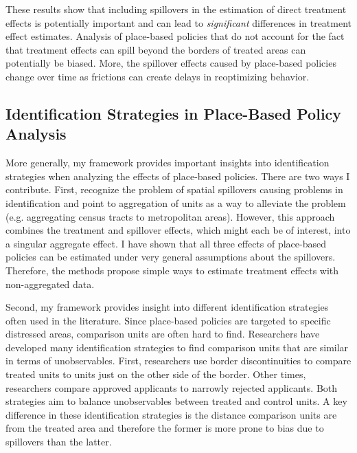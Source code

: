\documentclass[11pt]{article}
\begin{document}
These results show that including spillovers in the estimation of direct treatment effects is potentially important and can lead to \emph{significant} differences in treatment effect estimates. Analysis of place-based policies that do not account for the fact that treatment effects can spill beyond the borders of treated areas can potentially be biased. More, the spillover effects caused by place-based policies change over time as frictions can create delays in reoptimizing behavior. 

\subsection{Identification Strategies in Place-Based Policy Analysis}

More generally, my framework provides important insights into identification strategies when analyzing the effects of place-based policies. There are two ways I contribute. First, \citet{Baum-Snow_Ferreira_2015} recognize the problem of spatial spillovers causing problems in identification and point to aggregation of units as a way to alleviate the problem (e.g. aggregating census tracts to metropolitan areas). However, this approach combines the treatment and spillover effects, which might each be of interest, into a singular aggregate effect. I have shown that all three effects of place-based policies can be estimated under very general assumptions about the spillovers. Therefore, the methods propose simple ways to estimate treatment effects with non-aggregated data.

Second, my framework provides insight into different identification strategies often used in the literature. Since place-based policies are targeted to specific distressed areas, comparison units are often hard to find. Researchers have developed many identification strategies to find comparison units that are similar in terms of unobservables. First, researchers use border discontinuities to compare treated units to units just on the other side of the border. Other times, researchers compare approved applicants to narrowly rejected applicants. Both strategies aim to balance unobservables between treated and control units. A key difference in these identification strategies is the distance comparison units are from the treated area and therefore the former is more prone to bias due to spillovers than the latter.
\end{document}
